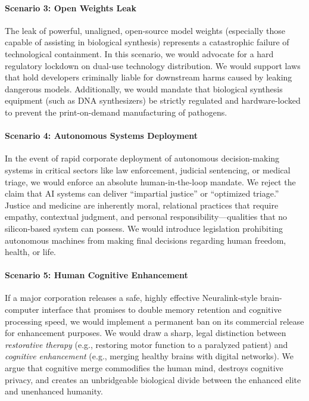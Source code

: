 \paragraph{Scenario 3: Open Weights
Leak}\label{scenario-3-open-weights-leak-1}

The leak of powerful, unaligned, open-source model weights (especially
those capable of assisting in biological synthesis) represents a
catastrophic failure of technological containment. In this scenario, we
would advocate for a hard regulatory lockdown on dual-use technology
distribution. We would support laws that hold developers criminally
liable for downstream harms caused by leaking dangerous models.
Additionally, we would mandate that biological synthesis equipment (such
as DNA synthesizers) be strictly regulated and hardware-locked to
prevent the print-on-demand manufacturing of pathogens.

\paragraph{Scenario 4: Autonomous Systems
Deployment}\label{scenario-4-autonomous-systems-deployment}

In the event of rapid corporate deployment of autonomous decision-making
systems in critical sectors like law enforcement, judicial sentencing,
or medical triage, we would enforce an absolute human-in-the-loop
mandate. We reject the claim that AI systems can deliver ``impartial
justice'' or ``optimized triage.'' Justice and medicine are inherently
moral, relational practices that require empathy, contextual judgment,
and personal responsibility---qualities that no silicon-based system can
possess. We would introduce legislation prohibiting autonomous machines
from making final decisions regarding human freedom, health, or life.

\paragraph{Scenario 5: Human Cognitive
Enhancement}\label{scenario-5-human-cognitive-enhancement}

If a major corporation releases a safe, highly effective Neuralink-style
brain-computer interface that promises to double memory retention and
cognitive processing speed, we would implement a permanent ban on its
commercial release for enhancement purposes. We would draw a sharp,
legal distinction between \emph{restorative therapy} (e.g., restoring
motor function to a paralyzed patient) and \emph{cognitive enhancement}
(e.g., merging healthy brains with digital networks). We argue that
cognitive merge commodifies the human mind, destroys cognitive privacy,
and creates an unbridgeable biological divide between the enhanced elite
and unenhanced humanity.

